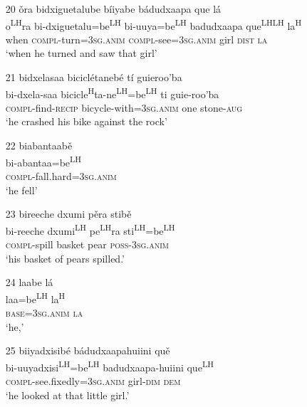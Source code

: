 \begin{itemize}
\item[20]
\glll \v{o}ra bidxiguetalube b\'{i}iyabe b\'{a}dudxaapa que l\'{a}\\
o\textsuperscript{LH}ra bi-dxiguetalu=be\textsuperscript{LH} bi-uuya=be\textsuperscript{LH} badudxaapa que\textsuperscript{LH}\textsuperscript{LH} la\textsuperscript{H}\\
when \textsc{compl}-turn=3\textsc{sg.anim} \textsc{compl}-see=3\textsc{sg.anim} girl \textsc{dist} \textsc{la}\\
\glt `when he turned and saw that girl'


\item[21]
\glll bidxelasaa bicicl\'{e}taneb\'{e} t\'{i} guieroo'ba\\
bi-dxela-saa bicicle\textsuperscript{H}ta-ne\textsuperscript{LH}=be\textsuperscript{LH} ti guie-roo'ba\\
\textsc{compl}-find-\textsc{recip} bicycle-with=3\textsc{sg.anim} one stone-\textsc{aug}\\
\glt `he crashed his bike against the rock' 


\item[22]
\glll biabantaab\v{e}\\
bi-abantaa=be\textsuperscript{LH}\\
\textsc{compl}-fall.hard=3\textsc{sg.anim}\\
\glt `he fell'


\item[23]
\glll bireeche dxumi p\v{e}ra stib\v{e}\\
bi-reeche dxumi\textsuperscript{LH} pe\textsuperscript{LH}ra sti\textsuperscript{LH}=be\textsuperscript{LH}\\
\textsc{compl}-spill basket pear \textsc{poss}-3\textsc{sg.anim}\\
\glt `his basket of pears spilled.'


\item[24]
\glll laabe l\'{a}\\
laa=be\textsuperscript{LH} la\textsuperscript{H}\\
\textsc{base}=3\textsc{sg.anim} \textsc{la}\\
\glt `he,'


\item[25]
\glll biiyadxisib\'{e} b\'{a}dudxaapahuiini qu\v{e}\\
bi-uuyadxisi\textsuperscript{LH}=be\textsuperscript{LH} badudxaapa-huiini que\textsuperscript{LH}\\
\textsc{compl}-see.fixedly=3\textsc{sg.anim} girl-\textsc{dim} \textsc{dem}\\
\glt `he looked at that little girl.' 



\end{itemize}
